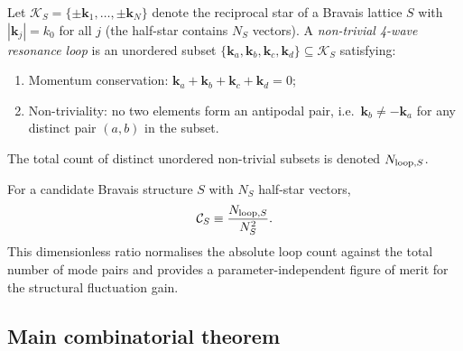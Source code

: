 \begin{definition}
\label{def:loop}
Let $\mathcal{K}_S = \{\pm\mathbf{k}_1,\ldots,\pm\mathbf{k}_N\}$
denote the reciprocal star of a Bravais lattice $S$ with
$|\mathbf{k}_j| = k_0$ for all $j$ (the half-star contains $N_S$
vectors). A \emph{non-trivial 4-wave resonance loop} is an unordered
subset
$\{\mathbf{k}_a,\mathbf{k}_b,\mathbf{k}_c,\mathbf{k}_d\}
\subseteq \mathcal{K}_S$ satisfying:
\begin{enumerate}
\item[(i)] Momentum conservation: $\mathbf{k}_a + \mathbf{k}_b +
\mathbf{k}_c + \mathbf{k}_d = 0$;
\item[(ii)] Non-triviality: no two elements form an antipodal pair,
i.e.\ $\mathbf{k}_b \neq -\mathbf{k}_a$ for any distinct pair $(a,b)$
in the subset.
\end{enumerate}
The total count of distinct unordered non-trivial subsets is denoted
$N_{{\rm loop},S}$.
\end{definition}

\begin{definition}
\label{def:C-S}
For a candidate Bravais structure $S$ with $N_S$ half-star vectors,
\begin{equation}
\mathcal{C}_S \equiv \frac{N_{{\rm loop},S}}{N_S^2}.
\end{equation}
This dimensionless ratio normalises the absolute loop count against
the total number of mode pairs and provides a parameter-independent
figure of merit for the structural fluctuation gain.
\end{definition}

\subsection{Main combinatorial theorem}

